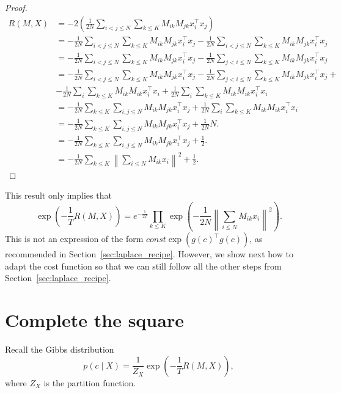 \begin{proof}
%
\begin{align}
R(M, X) &= -2\left(\frac{1}{2N}\sum_{i < j \leq N} \sum_{k \leq K} M_{ik}M_{jk}x_i^\top x_j\right)\\
&= -\frac{1}{2N}\sum_{i < j \leq N} \sum_{k \leq K} M_{ik}M_{jk}x_i^\top x_j -\frac{1}{2N}\sum_{i < j \leq N} \sum_{k \leq K} M_{ik}M_{jk}x_i^\top x_j\\
&= -\frac{1}{2N}\sum_{i < j \leq N} \sum_{k \leq K} M_{ik}M_{jk}x_i^\top x_j -\frac{1}{2N}\sum_{j < i \leq N} \sum_{k \leq K} M_{ik}M_{jk}x_i^\top x_j\\
&= -\frac{1}{2N}\sum_{i < j \leq N} \sum_{k \leq K} M_{ik}M_{jk}x_i^\top x_j-\frac{1}{2N}\sum_{j < i \leq N} \sum_{k \leq K} M_{ik}M_{jk}x_i^\top x_j+\\
& -\frac{1}{2N}\sum_{i} \sum_{k \leq K} M_{ik}M_{ik}x_i^\top x_i+\frac{1}{2N}\sum_{i} \sum_{k \leq K} M_{ik}M_{ik}x_i^\top x_i\\
&= -\frac{1}{2N}\sum_{k \leq K}\sum_{i, j \leq N}  M_{ik}M_{jk}x_i^\top x_j + \frac{1}{2N}\sum_{i} \sum_{k \leq K} M_{ik}M_{ik}x_i^\top x_i\\
&= - \frac{1}{2N}\sum_{k \leq K}\sum_{i, j \leq N} M_{ik}M_{jk} x_i^\top x_j + \frac{1}{2N}N.\\
&= - \frac{1}{2N}\sum_{k \leq K}\sum_{i, j \leq N} M_{ik}M_{jk} x_i^\top x_j + \frac{1}{2}.\\
&= - \frac{1}{2N}\sum_{k \leq K}\left\|\sum_{i \leq N} M_{ik}x_i\right\|^2 + \frac{1}{2}.
\end{align}
%
\end{proof}

This result only implies that
%
\begin{equation}
\exp\left(-\frac{1}{T}R(M, X)\right) = e^{-\frac{1}{2T}}\prod_{k \leq K}\exp\left(-\frac{1}{2N}\left\|\sum_{i \leq N}M_{ik}x_i\right\|^2\right).
\end{equation}
%
This is not an expression of the form $\textit{const} \exp\left(g(c)^\top g(c)\right)$, as recommended in Section~\ref{sec:laplace_recipe}. However, we show next how to adapt the cost function so that we can still follow all the other steps from Section~\ref{sec:laplace_recipe}.

\section{Complete the square}

Recall the Gibbs distribution
%
$$p(c \mid X) = \frac{1}{Z_X}\exp\left(-\frac{1}{T}R(M, X)\right),$$
%
where $Z_X$ is the partition function. 


